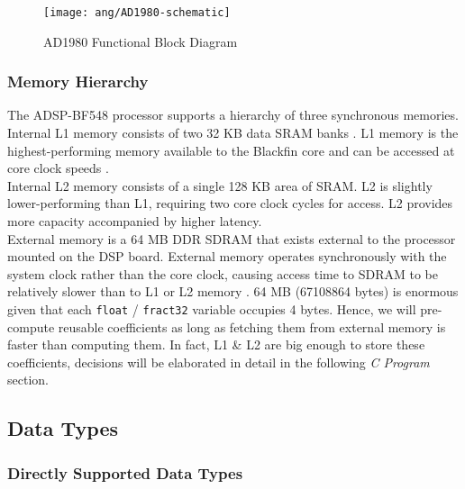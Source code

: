 \begin{figure}[H]
\centering
\texttt{[image: ang/AD1980-schematic]}
\caption{AD1980 Functional Block Diagram}
\label{AD1980-schematic}
\end{figure}


\subsubsection{Memory Hierarchy}
The ADSP-BF548 processor supports a hierarchy of three synchronous memories.\\

Internal L1 memory consists of two 32 KB data SRAM banks \cite{bf54x-hardware}. L1 memory is the highest-performing memory available to the Blackfin core and can be accessed at core clock speeds \cite{start-with-bf548}.\\

Internal L2 memory consists of a single 128 KB area of SRAM. L2 is slightly lower-performing than L1, requiring two core clock cycles for access. L2 provides more capacity accompanied by higher latency. \cite{start-with-bf548}\\

External memory is a 64 MB DDR SDRAM that exists external to the processor mounted on the DSP board. External memory operates synchronously with the system clock rather than the core clock, causing access time to SDRAM to be relatively slower than to L1 or L2 memory \cite{start-with-bf548}. 64 MB (67108864 bytes) is enormous given that each \texttt{float} / \texttt{fract32} variable occupies 4 bytes. Hence, we will pre-compute reusable coefficients as long as fetching them from external memory is faster than computing them. In fact, L1 \& L2 are big enough to store these coefficients, decisions will be elaborated in detail in the following \textit{C Program} section.


\subsection{Data Types}

\subsubsection{Directly Supported Data Types}

